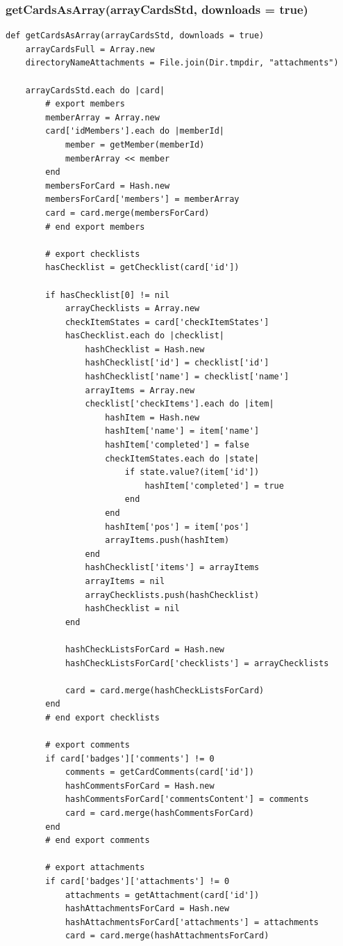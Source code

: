 \subsubsection{getCardsAsArray(arrayCardsStd, downloads = true)}
\begin{lstlisting}[aboveskip=1\baselineskip, caption= getCardsAsArray(), label=listing063]
def getCardsAsArray(arrayCardsStd, downloads = true)
	arrayCardsFull = Array.new
	directoryNameAttachments = File.join(Dir.tmpdir, "attachments")
	
	arrayCardsStd.each do |card|
		# export members
		memberArray = Array.new
		card['idMembers'].each do |memberId|
			member = getMember(memberId)
			memberArray << member			
		end
		membersForCard = Hash.new
		membersForCard['members'] = memberArray
		card = card.merge(membersForCard)
		# end export members		
		
		# export checklists
		hasChecklist = getChecklist(card['id']) 
		
		if hasChecklist[0] != nil
			arrayChecklists = Array.new
			checkItemStates = card['checkItemStates']
			hasChecklist.each do |checklist|  
				hashChecklist = Hash.new  
				hashChecklist['id'] = checklist['id']
				hashChecklist['name'] = checklist['name']
				arrayItems = Array.new
				checklist['checkItems'].each do |item|
					hashItem = Hash.new
					hashItem['name'] = item['name']
					hashItem['completed'] = false
					checkItemStates.each do |state|
						if state.value?(item['id'])
							hashItem['completed'] = true
						end
					end
					hashItem['pos'] = item['pos']
					arrayItems.push(hashItem)
				end
				hashChecklist['items'] = arrayItems
				arrayItems = nil
				arrayChecklists.push(hashChecklist)
				hashChecklist = nil
			end
			
			hashCheckListsForCard = Hash.new
			hashCheckListsForCard['checklists'] = arrayChecklists
			
			card = card.merge(hashCheckListsForCard)
		end
		# end export checklists
		
		# export comments
		if card['badges']['comments'] != 0
			comments = getCardComments(card['id'])
			hashCommentsForCard = Hash.new			
			hashCommentsForCard['commentsContent'] = comments			
			card = card.merge(hashCommentsForCard)
		end
		# end export comments
		
		# export attachments
		if card['badges']['attachments'] != 0
			attachments = getAttachment(card['id'])			
			hashAttachmentsForCard = Hash.new			
			hashAttachmentsForCard['attachments'] = attachments			
			card = card.merge(hashAttachmentsForCard)			
			

\end{lstlisting}
